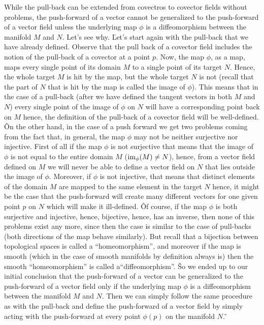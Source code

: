 While the pull-back can be extended from covectros to covector fields without problems, the push-forward of a vector
cannot be generalized to the push-forward of a vector field unless the underlying map $\phi$ is a diffeomorphism
between the manifold $M$ and $N$. Let's see why. \v

Let's start again with the pull-back that we have already defined. Observe that the pull back of a covector field
includes the notion of the pull-back of a covector at a point $p$. Now, the map $\phi$, as a map, maps every single
point of its domain $M$ to a single point of its target $N$. Hence, the whole target $M$ is hit by the map, but the
whole target $N$ is not (recall that the part of $N$ that is hit by the map is called the image of $\phi$). This
means that in the case of a pull-back (after we have defined the tangent vectors in both $M$ and $N$) every single
point of the image of $\phi$ on $N$ will have a corresponding point back on $M$ hence, the definition of the pull-back
of a covector field will be well-defined. \v

On the other hand, in the case of a push forward we get two problems coming from the fact that, in general, the map
$\phi$ may not be neither surjective nor injective. First of all if the map $\phi$ is not surjective that means that
the image of $\phi$ is not equal to the entire domain $M$ ($\mathrm{im}_\phi(M) \neq N$), hence, from a vector field defined
on $M$ we will never be able to define a vector field on $N$ that lies outside the image of $\phi$. Moreover, if
$\phi$ is not injective, that means that distinct elements of the domain $M$ are mapped to the same element in the
target $N$ hence, it might be the case that the push-forward will create many different vectors for one given point
$p$ on $N$ which will make it ill-defined. \v

Of course, if the map $\phi$ is both surjective and injective, hence, bijective, hence, has an inverse, then none of
this problems exist any more, since then the case is similar to the case of pull-backs (both directions of the map
behave similarly). But recall that a bijection between topological spaces is called a ``homeomorphism'', and moreover
if the map is smooth (which in the case of smooth manifolds by definition always is) then the smooth ``homeomorphism''
is called a``diffeomorphism''. \v

So we ended up to our initial conclusion that the push-forward of a vector can be generalized to the push-forward of
a vector field only if the underlying map $\phi$ is a diffeomorphism between the manifold $M$ and $N$. Then we can
simply follow the same procedure as with the pull-back and define the push-forward of a vector field by simply acting
with the push-forward at every point $\phi(p)$ on the manifold $N$. \v

